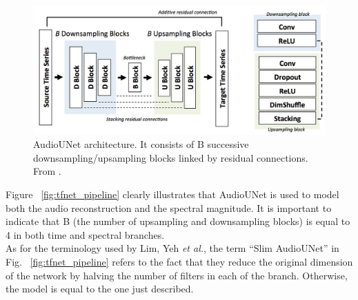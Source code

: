 \begin{figure}[!htb]
	\begin{center}
		\includegraphics[scale=0.35]{img/audiounet.png}
		\captionsetup{margin=2cm}
		\caption{AudioUNet architecture. It consists of B successive downsampling/upsampling blocks linked by residual connections. From \cite{kuleshov2017audio}.}
		\label{fig:audiounet}
	\end{center}
\end{figure}
\noindent Figure ~\ref{fig:tfnet_pipeline} clearly illustrates that AudioUNet is used to model both the audio reconstruction and the spectral magnitude. It is important to indicate that B (the number of upsampling and downsampling blocks) is equal to 4 in both time and spectral branches. \\
As for the terminology used by Lim, Yeh \textit{et al.}, the term “Slim AudioUNet” in Fig. ~\ref{fig:tfnet_pipeline} refers to the fact that they reduce the original dimension of the network by halving the number of filters in each of the branch. Otherwise, the model is equal to the one just described.

